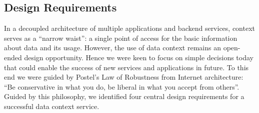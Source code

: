 \documentclass{sig-alternate}
\begin{document}







\subsection{Design Requirements}
In a decoupled architecture of multiple applications and backend services, context serves as a ``narrow waist'': a single point of access for the basic information about data and its usage. 
However, the use of data context remains an open-ended design opportunity. 
Hence we were keen to focus on simple decisions today that could enable the success of new services and applications in future. 
To this end we were guided by Postel's Law of Robustness from Internet architecture: ``Be conservative in what you do, be liberal in what you accept from others''.  
Guided by this philosophy, we identified four central design requirements for a successful data context service.
\end{document}
